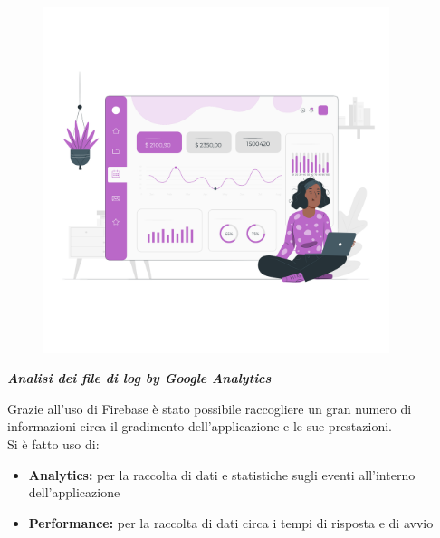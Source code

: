 \documentclass{article}
\begin{document}
		\begin{figure}[H]
			\centering
			\includegraphics[width=0.9\textwidth]{Immagini/fotoanalitiche}
		\end{figure}
		\begin{center}
			\textbf{\textit{\textcolor{dark_purple}{Analisi dei file di log by Google Analytics}}}\\
		\end{center}
		Grazie all’uso di Firebase è stato possibile raccogliere un gran numero di informazioni circa il gradimento dell’applicazione e le sue prestazioni.\\
		Si è fatto uso di:
		\begin{itemize}
			\item \textbf{Analytics:} per la raccolta di dati e statistiche sugli eventi all'interno dell'applicazione
			\item \textbf{Performance:} per la raccolta di dati circa i tempi di risposta e di avvio
		\end{itemize}
\end{document}
